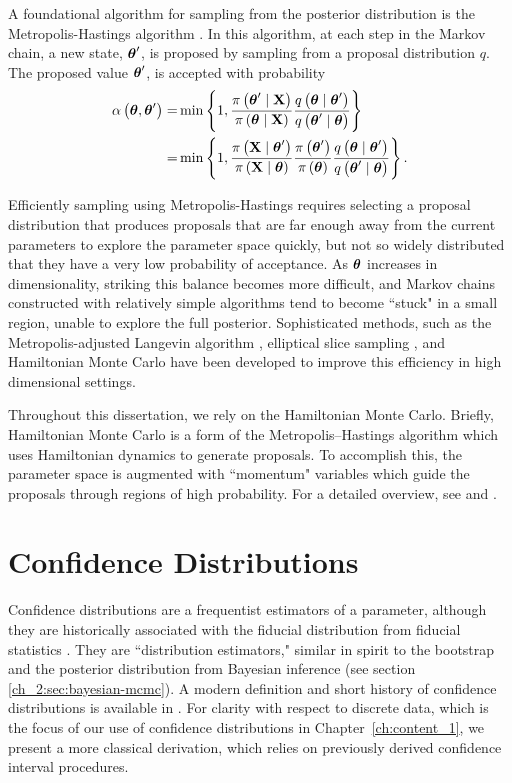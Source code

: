 A foundational algorithm for sampling from the posterior distribution is the Metropolis-Hastings algorithm \citep{Hastings1970Monte}.
In this algorithm, at each step in the Markov chain, a new state, \( \boldsymbol{\theta}^\prime \), is proposed by sampling from a proposal distribution \( q \).
The proposed value \( \boldsymbol{\theta}^\prime \), is accepted with probability 
\begin{align}
\alpha \left( \boldsymbol{\theta}, \boldsymbol{\theta}^\prime \right)   =&   \min \left\{ 1, \frac{\pi \left( \boldsymbol{\theta}^\prime \mid \mathbf{X} \right)}{\pi \left( \boldsymbol{\theta} \mid \mathbf{X} \right)} \frac{q \left( \boldsymbol{\theta} \mid \boldsymbol{\theta}^\prime \right)}{q \left( \boldsymbol{\theta}^\prime \mid \boldsymbol{\theta}  \right)} \right\}    \\
=&  \min \left\{ 1, \frac{\pi \left( \mathbf{X} \mid \boldsymbol{\theta}^\prime  \right)}{\pi \left( \mathbf{X} \mid \boldsymbol{\theta} \right)} \frac{\pi \left( \boldsymbol{\theta}^\prime \right)}{\pi \left( \boldsymbol{\theta} \right)} \frac{q \left( \boldsymbol{\theta} \mid \boldsymbol{\theta}^\prime \right)}{q \left( \boldsymbol{\theta}^\prime \mid \boldsymbol{\theta}  \right)} \right\}.
\end{align}

Efficiently sampling using Metropolis-Hastings requires selecting a proposal distribution that produces proposals that are far enough away from the current parameters to explore the parameter space quickly, but not so widely distributed that they have a very low probability of acceptance.
As \( \boldsymbol{\theta} \) increases in dimensionality, striking this balance becomes more difficult, and Markov chains constructed with relatively simple algorithms tend to become ``stuck" in a small region, unable to explore the full posterior.
Sophisticated methods, such as the Metropolis-adjusted Langevin algorithm \citep{Besag1994Comments}, elliptical slice sampling \citep{Murray202Elliptical}, and Hamiltonian Monte Carlo \citep{Duane1987Hybrid} have been developed to improve this efficiency in high dimensional settings.

Throughout this dissertation, we rely on the Hamiltonian Monte Carlo.
Briefly, Hamiltonian Monte Carlo is a form of the Metropolis–Hastings algorithm which uses Hamiltonian dynamics to generate proposals.
To accomplish this, the parameter space is augmented with ``momentum" variables which guide the proposals through regions of high probability.
For a detailed overview, see \citet{betancourt2018conceptual} and \citet{neal2011mcmc}.

\section{Confidence Distributions}
\label{ch_2:sec:confidence_distributions}
Confidence distributions are a frequentist estimators of a parameter, although they are historically associated with the fiducial distribution from fiducial statistics \citep{Xie2013}.
They are ``distribution estimators," similar in spirit to the bootstrap and the posterior distribution from Bayesian inference (see section \ref{ch_2:sec:bayesian-mcmc}).
A modern definition and short history of confidence distributions is available in \citep{Xie2013}.
For clarity with respect to discrete data, which is the focus of our use of confidence distributions in Chapter~\ref{ch:content_1}, we present a more classical derivation, which relies on previously derived confidence interval procedures.

